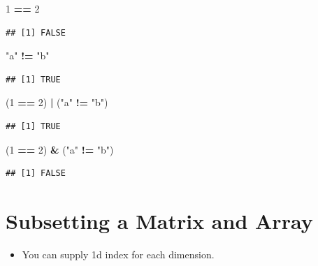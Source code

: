 \documentclass[]{book}
\newenvironment{Shaded}{\begin{snugshade}}{\end{snugshade}}
\newcommand{\DecValTok}[1]{\textcolor[rgb]{0.00,0.00,0.81}{#1}}
\newcommand{\NormalTok}[1]{#1}
\newcommand{\OperatorTok}[1]{\textcolor[rgb]{0.81,0.36,0.00}{\textbf{#1}}}
\newcommand{\StringTok}[1]{\textcolor[rgb]{0.31,0.60,0.02}{#1}}
\providecommand{\tightlist}{%
  \setlength{\itemsep}{0pt}\setlength{\parskip}{0pt}}
\begin{document}
\begin{Shaded}
\begin{Highlighting}[]
\DecValTok{1} \OperatorTok{==}\StringTok{ }\DecValTok{2}
\end{Highlighting}
\end{Shaded}

\begin{verbatim}
## [1] FALSE
\end{verbatim}

\begin{Shaded}
\begin{Highlighting}[]
\StringTok{"a"} \OperatorTok{!=}\StringTok{ "b"}
\end{Highlighting}
\end{Shaded}

\begin{verbatim}
## [1] TRUE
\end{verbatim}

\begin{Shaded}
\begin{Highlighting}[]
\NormalTok{(}\DecValTok{1} \OperatorTok{==}\StringTok{ }\DecValTok{2}\NormalTok{) }\OperatorTok{|}\StringTok{ }\NormalTok{(}\StringTok{"a"} \OperatorTok{!=}\StringTok{ "b"}\NormalTok{)}
\end{Highlighting}
\end{Shaded}

\begin{verbatim}
## [1] TRUE
\end{verbatim}

\begin{Shaded}
\begin{Highlighting}[]
\NormalTok{(}\DecValTok{1} \OperatorTok{==}\StringTok{ }\DecValTok{2}\NormalTok{) }\OperatorTok{&}\StringTok{ }\NormalTok{(}\StringTok{"a"} \OperatorTok{!=}\StringTok{ "b"}\NormalTok{)}
\end{Highlighting}
\end{Shaded}

\begin{verbatim}
## [1] FALSE
\end{verbatim}

\hypertarget{subsetting-a-matrix-and-array}{%
\section{Subsetting a Matrix and Array}\label{subsetting-a-matrix-and-array}}

\begin{itemize}
\tightlist
\item
  You can supply 1d index for each dimension.
\end{itemize}
\end{document}
